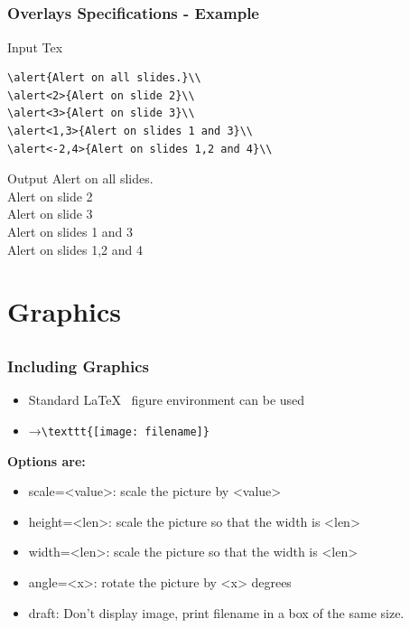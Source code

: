 \documentclass[[newPxFont]{beamer}
\begin{document}
\subsection{}
\begin{frame}[fragile]
  \frametitle{Overlays Specifications - Example}
\begin{block}{Input Tex}
\begin{verbatim}
\alert{Alert on all slides.}\\
\alert<2>{Alert on slide 2}\\
\alert<3>{Alert on slide 3}\\
\alert<1,3>{Alert on slides 1 and 3}\\
\alert<-2,4>{Alert on slides 1,2 and 4}\\
\end{verbatim}
 \end{block}
\begin{block}{Output}
\alert{Alert on all slides.}\\
\alert<2>{Alert on slide 2}\\
\alert<3>{Alert on slide 3}\\
\alert<1,3>{Alert on slides 1 and 3}\\
\alert<-2,4>{Alert on slides 1,2 and 4}\\
 \end{block}
\end{frame}
\section{Graphics}
\subsection{}
\begin{frame}[fragile]
\frametitle{Including Graphics}
\begin{itemize}
  \item Standard \LaTeX~ figure environment can be used
  \item →\verb+\texttt{[image: filename]}+
\end{itemize}
\textbf{Options are:}\\
\begin{itemize}
\item scale=<value>: scale the picture by <value>
\item height=<len>: scale the picture so that the width is <len>
\item width=<len>: scale the picture so that the width is <len>
\item angle=<x>: rotate the picture by <x> degrees
\item draft: Don’t display image, print filename in a box of the same size.
\end{itemize}
\end{frame}
\end{document}
